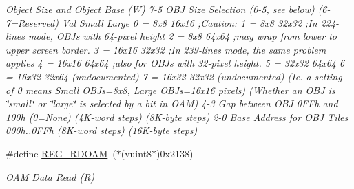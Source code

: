 \begin{DoxyCompactItemize}
\begin{DoxyCompactList}\small\item\em Object Size and Object Base (W) 7-\/5 O\+BJ Size Selection (0-\/5, see below) (6-\/7=Reserved) Val Small Large 0 = 8x8 16x16 ;Caution\+: 1 = 8x8 32x32 ;In 224-\/lines mode, O\+B\+Js with 64-\/pixel height 2 = 8x8 64x64 ;may wrap from lower to upper screen border. 3 = 16x16 32x32 ;In 239-\/lines mode, the same problem applies 4 = 16x16 64x64 ;also for O\+B\+Js with 32-\/pixel height. 5 = 32x32 64x64 6 = 16x32 32x64 (undocumented) 7 = 16x32 32x32 (undocumented) (Ie. a setting of 0 means Small O\+B\+Js=8x8, Large O\+B\+Js=16x16 pixels) (Whether an O\+BJ is \char`\"{}small\char`\"{} or \char`\"{}large\char`\"{} is selected by a bit in O\+AM) 4-\/3 Gap between O\+BJ 0\+F\+Fh and 100h (0=None) (4\+K-\/word steps) (8\+K-\/byte steps) 2-\/0 Base Address for O\+BJ Tiles 000h..0\+F\+Fh (8\+K-\/word steps) (16\+K-\/byte steps) \end{DoxyCompactList}\item 
\mbox{\label{a00350_ac815cf72d6b31fb9e38042a0eacee023}} 
\#define \hyperlink{a00350_ac815cf72d6b31fb9e38042a0eacee023}{R\+E\+G\+\_\+\+R\+D\+O\+AM}~($\ast$(vuint8$\ast$)0x2138)
\begin{DoxyCompactList}\small\item\em O\+AM Data Read (R) \end{DoxyCompactList}\end{DoxyCompactItemize}
